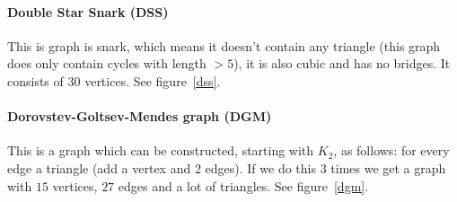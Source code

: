 \documentclass[paper=a4, fontsize=11pt]{scrartcl} %
\begin{document}
\paragraph{Double Star Snark (DSS)} This is graph is snark, which means it doesn't contain any triangle (this graph does only contain cycles with length $>5$), it is also cubic and has no bridges. It consists of $30$ vertices. See figure~\ref{dss}.
\paragraph{Dorovstev-Goltsev-Mendes graph (DGM)} This is a graph which can be constructed, starting with $K_{2}$, as follows: for every edge a triangle (add a vertex and 2 edges). If we do this $3$ times we get a graph with $15$ vertices, $27$ edges and a lot of triangles. See figure~\ref{dgm}.

\end{document}
